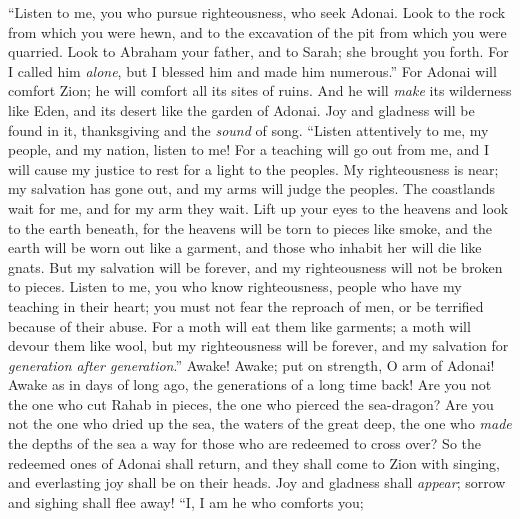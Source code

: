 \begin{biblechapter} %
 “Listen to me, you who pursue righteousness, 
who seek Adonai. 
Look to the rock from which you were hewn, 
and to the excavation of the pit from which you were quarried.
\verse Look to Abraham your father, 
and to Sarah; she brought you forth. 
For I called him \textit{alone}, 
but I blessed him and made him numerous.”
\verse For Adonai will comfort Zion; 
he will comfort all its sites of ruins. 
And he will \textit{make} its wilderness like Eden, 
and its desert like the garden of Adonai. 
Joy and gladness will be found in it, 
thanksgiving and the \textit{sound} of song.
\verse “Listen attentively to me, my people, 
and my nation, listen to me! 
For a teaching will go out from me, 
and I will cause my justice to rest for a light to the peoples.
\verse My righteousness is near; my salvation has gone out, 
and my arms will judge the peoples. 
The coastlands wait for me, 
and for my arm they wait.
\verse Lift up your eyes to the heavens 
and look to the earth beneath, 
for the heavens will be torn to pieces like smoke, 
and the earth will be worn out like a garment, 
and those who inhabit her will die like gnats. 
But my salvation will be forever, 
and my righteousness will not be broken to pieces.
\verse Listen to me, you who know righteousness, 
people who have my teaching in their heart; 
you must not fear the reproach of men, 
or be terrified because of their abuse.
\verse For a moth will eat them like garments; 
a moth will devour them like wool, 
but my righteousness will be forever, 
and my salvation for \textit{generation after generation}.”
\verse Awake! Awake; put on strength, O arm of Adonai! 
Awake as in days of long ago, 
the generations of a long time back! 
Are you not the one who cut Rahab in pieces, 
the one who pierced the sea-dragon?
\verse Are you not the one who dried up the sea, 
the waters of the great deep, 
the one who \textit{made} the depths of the sea a way 
for those who are redeemed to cross over?
\verse So the redeemed ones of Adonai shall return, 
and they shall come to Zion with singing, 
and everlasting joy shall be on their heads. 
Joy and gladness shall \textit{appear}; 
sorrow and sighing shall flee away!
\verse “I, I am he who comforts you; 

\end{biblechapter}
